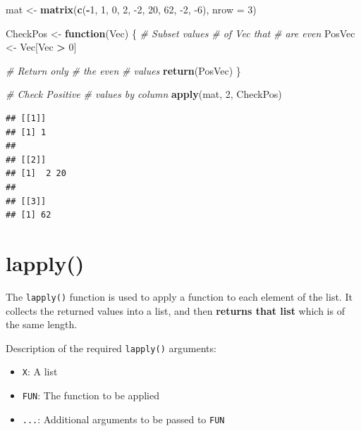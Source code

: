 \documentclass[
]{book}
\newenvironment{Shaded}{\begin{snugshade}}{\end{snugshade}}
\newcommand{\CommentTok}[1]{\textcolor[rgb]{0.56,0.35,0.01}{\textit{#1}}}
\newcommand{\ControlFlowTok}[1]{\textcolor[rgb]{0.13,0.29,0.53}{\textbf{#1}}}
\newcommand{\DataTypeTok}[1]{\textcolor[rgb]{0.13,0.29,0.53}{#1}}
\newcommand{\DecValTok}[1]{\textcolor[rgb]{0.00,0.00,0.81}{#1}}
\newcommand{\KeywordTok}[1]{\textcolor[rgb]{0.13,0.29,0.53}{\textbf{#1}}}
\newcommand{\NormalTok}[1]{#1}
\newcommand{\OperatorTok}[1]{\textcolor[rgb]{0.81,0.36,0.00}{\textbf{#1}}}
\newcommand{\StringTok}[1]{\textcolor[rgb]{0.31,0.60,0.02}{#1}}
\providecommand{\tightlist}{%
  \setlength{\itemsep}{0pt}\setlength{\parskip}{0pt}}
\begin{document}
\begin{Shaded}
\begin{Highlighting}[]
\NormalTok{mat <-}\StringTok{ }\KeywordTok{matrix}\NormalTok{(}\KeywordTok{c}\NormalTok{(}\OperatorTok{-}\DecValTok{1}\NormalTok{, }\DecValTok{1}\NormalTok{,}
    \DecValTok{0}\NormalTok{, }\DecValTok{2}\NormalTok{, }\DecValTok{-2}\NormalTok{, }\DecValTok{20}\NormalTok{, }\DecValTok{62}\NormalTok{,}
    \DecValTok{-2}\NormalTok{, }\DecValTok{-6}\NormalTok{), }\DataTypeTok{nrow =} \DecValTok{3}\NormalTok{)}

\NormalTok{CheckPos <-}\StringTok{ }\ControlFlowTok{function}\NormalTok{(Vec) \{}
    \CommentTok{# Subset values}
    \CommentTok{# of Vec that}
    \CommentTok{# are even}
\NormalTok{    PosVec <-}\StringTok{ }\NormalTok{Vec[Vec }\OperatorTok{>}
\StringTok{        }\DecValTok{0}\NormalTok{]}

    \CommentTok{# Return only}
    \CommentTok{# the even}
    \CommentTok{# values}
    \KeywordTok{return}\NormalTok{(PosVec)}
\NormalTok{\}}

\CommentTok{# Check Positive}
\CommentTok{# values by column}
\KeywordTok{apply}\NormalTok{(mat, }\DecValTok{2}\NormalTok{, CheckPos)}
\end{Highlighting}
\end{Shaded}

\begin{verbatim}
## [[1]]
## [1] 1
## 
## [[2]]
## [1]  2 20
## 
## [[3]]
## [1] 62
\end{verbatim}

\hypertarget{lapply}{%
\section{lapply()}\label{lapply}}

The \texttt{lapply()} function is used to apply a function to each element of the list. It collects the returned values into a list, and then \textbf{returns that list} which is of the same length.

Description of the required \texttt{lapply()} arguments:

\begin{itemize}
\tightlist
\item
  \texttt{X}: A list
\item
  \texttt{FUN}: The function to be applied
\item
  \texttt{...}: Additional arguments to be passed to \texttt{FUN}
\end{itemize}
\end{document}
